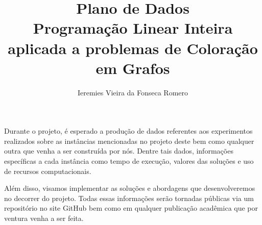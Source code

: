 \documentclass[11pt]{article}
\author{Ieremies Vieira da Fonseca Romero}
\date{}
\title{Plano de Dados\\\medskip
\large Programação Linear Inteira aplicada a problemas de Coloração em Grafos}
\begin{document}
\maketitle
Durante o projeto, é esperado a produção de dados referentes aos experimentos realizados sobre as instâncias mencionadas no projeto deste \autocite{GraphColoringInstances} bem como qualquer outra que venha a ser construída por nós.
Dentre tais dados, informações específicas a cada instância como tempo de execução, valores das soluções e uso de recursos computacionais.

Além disso, visamos implementar as soluções e abordagens que desenvolveremos no decorrer do projeto.
Todas essas informações serão tornadas públicas via um repositório no site GitHub bem como em qualquer publicação acadêmica que por ventura venha a ser feita.

\printbibliography
\end{document}
